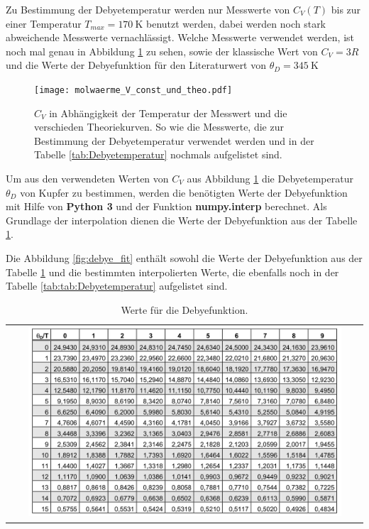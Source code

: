 Zu Bestimmung der Debyetemperatur werden nur Messwerte von $C_V(T)$ bis zur einer Temperatur $T_{max}=\SI{170}{\kelvin} $ benutzt werden, dabei werden noch stark abweichende Messwerte vernachlässigt.
Welche Messwerte verwendet werden, ist noch mal genau in Abbildung \ref{fig:cool} zu sehen, sowie
der klassische Wert von $C_V=3R$ und die Werte der Debyefunktion
für den Literaturwert von $\theta_D = \SI{345}{\kelvin}$  \cite{debyetemp}


\begin{figure}
 \centering
 \texttt{[image: molwaerme\_V\_const\_und\_theo.pdf]}
   \caption{ $C_V$ in Abhängigkeit der Temperatur
    der Messwert und die verschieden
    Theoriekurven. So wie die Messwerte,
   die zur Bestimmung der Debyetemperatur
    verwendet werden und in der
    Tabelle \ref{tab:Debyetemperatur}
    nochmals aufgelistet sind.}
   \label{fig:cool}
 \end{figure}

 Um aus den verwendeten Werten von $C_V$ aus
Abbildung \ref{fig:cool} die Debyetemperatur
 $\theta_D$ von Kupfer zu bestimmen,
werden die benötigten Werte der Debyefunktion
mit Hilfe von \textbf{Python 3} und der
Funktion \textbf{numpy.interp} \cite{interp}
berechnet. Als Grundlage der interpolation
dienen die Werte der Debyefunktion aus der
Tabelle \ref{fig:debye}.

Die Abbildung \ref{fig:debye_fit} enthält sowohl
die Werte der Debyefunktion
aus der Tabelle \ref{fig:debye} und die bestimmten
interpolierten Werte, die ebenfalls noch in der Tabelle
\ref{tab:tab:Debyetemperatur} aufgelistet sind.

 \begin{table}
  \centering
  \caption{Werte für die Debyefunktion.}
  \label{fig:debye}
\begin{tabular}{c}
  \includegraphics[width=0.9\textwidth]{Debye.PNG}
\end{tabular}
\end{table}

